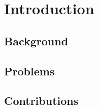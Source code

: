 \chapter{Introduction}
\label{chapter:intro}


\section{Background}
\label{subsec:intro}


\section{Problems}
\label{subsec:intro}

\section{Contributions}
\label{subsec:intro}
